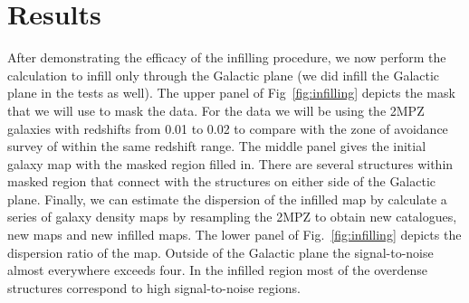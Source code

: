 \documentclass[useAMS,usenatbib]{mn2e}
\begin{document}
\section{Results}

After demonstrating the efficacy of the infilling procedure, we now
perform the calculation to infill only through the Galactic plane (we
did infill the Galactic plane in the tests as well).  The upper panel
of Fig~\ref{fig:infilling} depicts the mask that we will use to mask
the data.  For the data we will be using the 2MPZ galaxies with
redshifts from 0.01 to 0.02 to compare with the zone of avoidance
survey of \citet{2016AJ....151...52S} within the same redshift
range. The middle panel gives the initial galaxy map with the masked
region filled in.  There are several structures within masked region
that connect with the structures on either side of the Galactic plane.
Finally, we can estimate the dispersion of the infilled map by
calculate a series of galaxy density maps by resampling the 2MPZ to
obtain new catalogues, new maps and new infilled maps.  The lower
panel of Fig.~\ref{fig:infilling} depicts the dispersion ratio of the
map.  Outside of the Galactic plane the signal-to-noise almost
everywhere exceeds four.  In the infilled region most of the overdense
structures correspond to high signal-to-noise regions.
\end{document}
